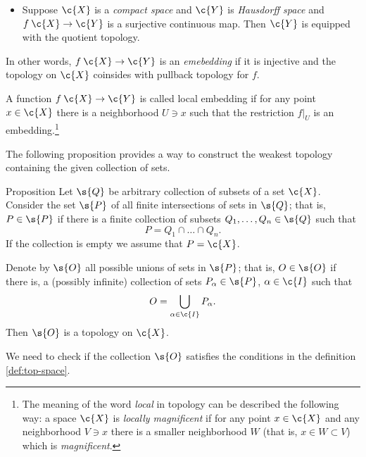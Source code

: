 \begin{itemize}
\item Suppose $\c{X}$ is a \emph{compact space} and  $\c{Y}$ is \emph{Hausdorff space} and $f\: \c{X}\to\c{Y}$ is a surjective continuous map.
Then $\c{Y}$ is equipped with the quotient topology.
\end{itemize}















In other words, $f\:\c{X}\to \c{Y}$ is an \emph{emebedding} if it is injective and the topology on $\c{X}$ coinsides with pullback topology for $f$.

A function $f\:\c{X}\to \c{Y}$ is called local embedding if for any point $x\in \c{X}$ there is a neighborhood $U\ni x$ such that the restriction $f|_U$ is an embedding.\footnote{The meaning of the word \emph{local} in topology can be described the following way: a space $\c{X}$ is \emph{locally magnificent} if for any point $x\in \c{X}$ and any neighborhood $V\ni x$ there is a smaller neighborhood $W$ (that is, $x\in W\subset V$) which is \emph{magnificent}.}
 
 
 
 
 
 
 
 
 
 
 
 
The following proposition provides a way to construct the weakest topology containing the given collection of sets.

\begin{thm}{Proposition}
Let $\s{Q}$ be arbitrary collection of subsets of a set $\c{X}$.
Consider the set $\s{P}$ of all finite intersections of sets in $\s{Q}$;
that is, $P\in \s{P}$ if there is a finite collection of subsets $Q_1,\dots,Q_n\in \s{Q}$ such that 
\[P=Q_1\cap\dots\cap Q_n.\]
If the collection is empty we assume that $P=\c{X}$.

Denote by $\s{O}$ all possible unions of sets in $\s{P}$;
that is, $O\in \s{O}$ if there is, a (possibly infinite) collection of sets $P_\alpha\in\s{P}$, $\alpha\in\c{I}$ such that 
\[O=\bigcup_{\alpha\in\c{I}}P_\alpha.\]
Then $\s{O}$ is a topology on $\c{X}$.
\end{thm}

We need to check if the collection $\s{O}$ satisfies the conditions in the definition \ref{def:top-space}.

